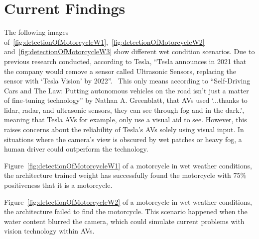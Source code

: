 \documentclass[conference]{IEEEtran}
\begin{document}
\section{Current Findings}
	The following images of~\ref{fig:detectionOfMotorcycleW1},~\ref{fig:detectionOfMotorcycleW2} and~\ref{fig:detectionOfMotorcycleW3} show different wet condition scenarios. Due to previous research conducted, according to Tesla, ``Tesla announces in 2021 that the company would remove a sensor called Ultrasonic Sensors, replacing the sensor with `Tesla Vision' by 2022''.~\cite{noauthor_tesla_nodate} This only means according to ``Self-Driving Cars and The Law: Putting autonomous vehicles on the road isn't just a matter of fine-tuning technology'' by Nathan A. Greenblatt, that AVs used `...thanks to lidar, radar, and ultrasonic sensors, they can see through fog and in the dark.', meaning that Tesla AVs for example, only use a visual aid to see. However, this raises concerns about the reliability of Tesla's AVs solely using visual input. In situations where the camera's view is obscured by wet patches or heavy fog, a human driver could outperform the technology.

	Figure~\ref{fig:detectionOfMotorcycleW1} of a motorcycle in wet weather conditions, the architecture trained weight has successfully found the motorcycle with 75\% positiveness that it is a motorcycle.

	Figure~\ref{fig:detectionOfMotorcycleW2} of a motorcycle in wet weather conditions, the architecture failed to find the motorcycle. This scenario happened when the water content blurred the camera, which could simulate current problems with vision technology within AVs.
\end{document}
